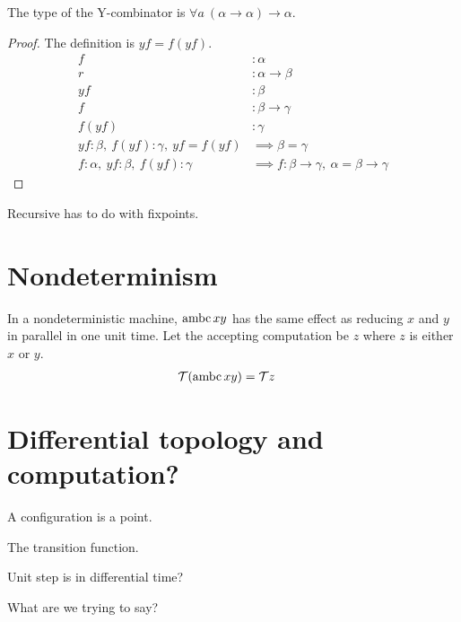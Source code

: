 \begin{mlem}
    The type of the Y-combinator is $\forall a ~ (\alpha \to \alpha) \to \alpha$.
    \begin{proof}
        The definition is $yf = f(yf)$.
        \begin{align}
            f &: \alpha
            \\
            r &: \alpha \to \beta
            \\
            yf &: \beta
            \\
            f &: \beta \to \gamma
            \\
            f(yf) &: \gamma
            \\
            yf : \beta, \ f(yf) : \gamma, \ yf = f(yf) &\implies \beta = \gamma
            \\
            f : \alpha, \ yf : \beta, \ f(yf) : \gamma &\implies f : \beta \to \gamma, \ \alpha = \beta \to \gamma
        \end{align}
    \end{proof}
\end{mlem}

Recursive has to do with fixpoints.

\section{Nondeterminism}

In a nondeterministic machine, $\operatorname{ambc} x y$
has the same effect as reducing $x$ and $y$ in parallel in one unit time.
Let the accepting computation be $z$ where $z$ is either $x$ or $y$.
\begin{align}
    \mathcal{T}(\operatorname{ambc} xy) &= \mathcal{T} z
\end{align}

\section{Differential topology and computation?}

A configuration is a point.

The transition function.

Unit step is in differential time?

What are we trying to say?
